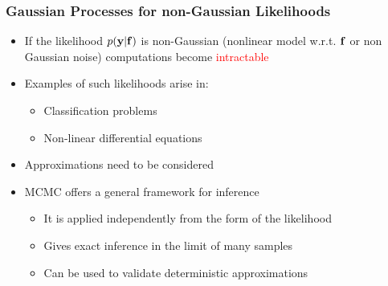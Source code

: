 \documentclass{beamer}
\begin{document}
\frame
{
  \frametitle{Gaussian Processes for non-Gaussian Likelihoods}

  \begin{itemize}
  \item If the likelihood $p(\mathbf{y}|\mathbf{f})$ is non-Gaussian 
        (nonlinear model w.r.t. $\mathbf{f}$ or non Gaussian noise)  
         computations become \textcolor{red}{intractable}

  \item Examples of such likelihoods arise in:   
 
 \begin{itemize}
  \item  Classification problems

   \item Non-linear differential equations 

 \end{itemize}


  \item Approximations need to be considered 

     
  \item  MCMC offers a general framework for inference 
             \begin{itemize}
             \item It is applied independently from the form of
                       the likelihood  
             \item Gives exact inference in the limit of many samples  

             \item Can be used to validate deterministic
             approximations  
            
             \end{itemize}

  \end{itemize}
}
\end{document}
